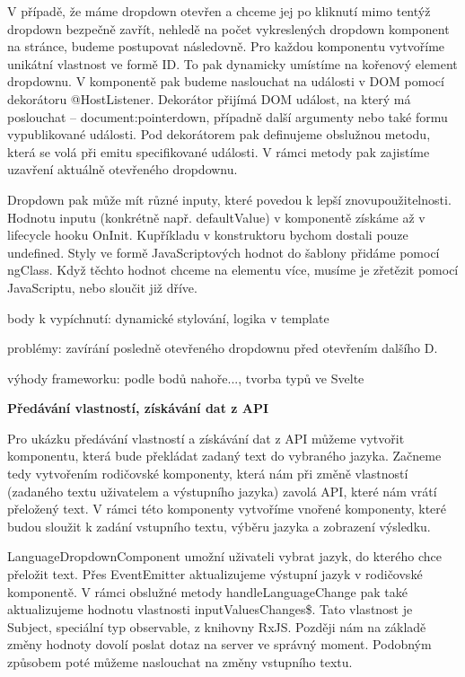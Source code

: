 V případě, že máme dropdown otevřen a chceme jej po kliknutí mimo tentýž dropdown bezpečně zavřít, nehledě na počet vykreslených dropdown komponent na stránce, budeme postupovat následovně. 
Pro každou komponentu vytvoříme unikátní vlastnost ve formě ID. To pak dynamicky umístíme na kořenový element dropdownu. 
V komponentě pak budeme naslouchat na události v DOM pomocí dekorátoru @HostListener. 
Dekorátor přijímá DOM událost, na který má poslouchat -- document:pointerdown, případně další argumenty nebo také formu vypublikované události. 
Pod dekorátorem pak definujeme obslužnou metodu, která se volá při emitu specifikované události. V rámci metody pak zajistíme uzavření aktuálně otevřeného dropdownu.

Dropdown pak může mít různé inputy, které povedou k lepší znovupoužitelnosti. Hodnotu inputu (konkrétně např. defaultValue) v komponentě získáme až v lifecycle hooku OnInit. 
Kupříkladu v konstruktoru bychom dostali pouze undefined. Styly ve formě JavaScriptových hodnot do šablony přidáme pomocí ngClass. 
Když těchto hodnot chceme na elementu více, musíme je zřetězit pomocí JavaScriptu, nebo sloučit již dříve.

\begin{citemize}
	\item body k vypíchnutí: dynamické stylování, logika v template
	\item problémy: zavírání posledně otevřeného dropdownu před otevřením dalšího D.
	\item výhody frameworku: podle bodů nahoře..., tvorba typů ve Svelte
\end{citemize}

\begin{flushleft}
  \textbf{Předávání vlastností, získávání dat z API}
\end{flushleft}

Pro ukázku předávání vlastností a získávání dat z API můžeme vytvořit komponentu, která bude překládat zadaný text do vybraného jazyka. 
Začneme tedy vytvořením rodičovské komponenty, která nám při změně vlastností (zadaného textu uživatelem a výstupního jazyka) zavolá API, které nám vrátí přeložený text. 
V rámci této komponenty vytvoříme vnořené komponenty, které budou sloužit k zadání vstupního textu, výběru jazyka a zobrazení výsledku. 

LanguageDropdownComponent umožní uživateli vybrat jazyk, do kterého chce přeložit text. 
Přes EventEmitter aktualizujeme výstupní jazyk v rodičovské komponentě. V rámci obslužné metody handleLanguageChange pak také aktualizujeme hodnotu vlastnosti inputValuesChanges\$.
Tato vlastnost je Subject, speciální typ observable, z knihovny RxJS. Později nám na základě změny hodnoty dovolí poslat dotaz na server ve správný moment. 
Podobným způsobem poté můžeme naslouchat na změny vstupního textu.


